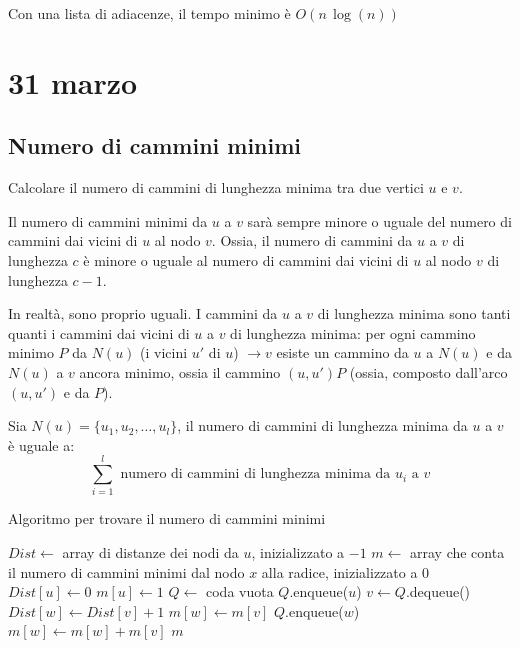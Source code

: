 Con una lista di adiacenze, il tempo minimo \`e $O(n \, \log(n))$

\clearpage

\section{31 marzo}

\subsection{Numero di cammini minimi}

\begin{esercizio}
Calcolare il numero di cammini di lunghezza minima tra due vertici $u$ e $v$.
\end{esercizio}

Il numero di cammini minimi da $u$ a $v$ sar\`a sempre minore o uguale del numero di cammini dai vicini di $u$ al nodo $v$. Ossia, il numero di cammini da $u$ a $v$ di lunghezza $c$ \`e minore o uguale al numero di cammini dai vicini di $u$ al nodo $v$ di lunghezza $c-1$.

In realt\`a, sono proprio uguali. I cammini da $u$ a $v$ di lunghezza minima sono tanti quanti i cammini dai vicini di $u$ a $v$ di lunghezza minima: per ogni cammino minimo $P$ da $N(u)$ (i vicini $u'$ di $u$) $\to v$ esiste un cammino da $u$ a $N(u)$ e da $N(u)$ a $v$ ancora minimo, ossia il cammino $(u, u') P$ (ossia, composto dall'arco $(u,u')$ e da $P$).

Sia $N(u) = \{ u_1, u_2, \ldots, u_l \}$, il numero di cammini di lunghezza minima da $u$ a $v$ \`e uguale a:
\[
\sum_{i = 1}^{l} \text{ numero di cammini di lunghezza minima da $u_i$ a $v$}
\]
\begin{algorithm}
\caption{Algoritmo per trovare il numero di cammini minimi}
\begin{algorithmic}[1]
    \State $Dist \gets$ array di distanze dei nodi da $u$, inizializzato a $-1$
    \State $m \gets$ array che conta il numero di cammini minimi dal nodo $x$ alla radice, inizializzato a 0
    \State $Dist[u] \gets 0$
    \State $m[u] \gets 1$
    \State $Q \gets$ coda vuota
    \State $Q$.enqueue($u$)
        \State $v \gets Q$.dequeue()
                \State $Dist[w] \gets Dist[v] + 1$
                \State $m[w] \gets m[v]$
                \State $Q$.enqueue($w$)
                \State $m[w] \gets m[w] + m[v]$
            \EndIf
        \EndFor
    \EndWhile
    \State \Return $m$
\EndFunction
\end{algorithmic}
\end{algorithm}

